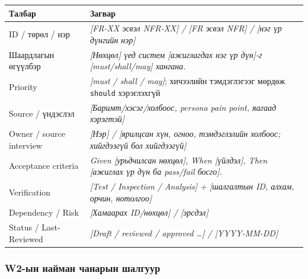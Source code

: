 \documentclass[
  11pt,
  a4paper,
]{article}
\begin{document}
\begin{longtable}[]{@{}
  >{\raggedright\arraybackslash}p{}
  >{\raggedright\arraybackslash}p{}@{}}
\toprule\noalign{}
\begin{minipage}[b]{\linewidth}\raggedright
Талбар
\end{minipage} & \begin{minipage}[b]{\linewidth}\raggedright
Загвар
\end{minipage} \\
\midrule\noalign{}
\endhead
\bottomrule\noalign{}
\endlastfoot
ID / төрөл / нэр & \emph{{[}FR-XX эсвэл NFR-XX{]} / {[}FR эсвэл NFR{]} /
{[}нэг үр дүнгийн нэр{]}} \\
Шаардлагын өгүүлбэр & \emph{{[}Нөхцөл{]} үед систем {[}ажиглагдах нэг үр
дүн{]}-г {[}must/shall/may{]} хангана.} \\
Priority & \emph{{[}must / shall / may{]}}; хичээлийн тэмдэглэгээг
мөрдөж \nolinkurl{should} хэрэглэхгүй \\
Source / үндэслэл & \emph{{[}Баримт/хэсэг/холбоос, persona pain point,
яагаад хэрэгтэй{]}} \\
Owner / source interview & \emph{{[}Нэр{]} / {[}ярилцсан хүн, огноо,
тэмдэглэлийн холбоос; хийгдээгүй бол хийгдээгүй{]}} \\
Acceptance criteria & \emph{Given {[}урьдчилсан нөхцөл{]}, When
{[}үйлдэл{]}, Then {[}ажиглах үр дүн ба pass/fail босго{]}.} \\
Verification & \emph{{[}Test / Inspection / Analysis{]} + {[}шалгалтын
ID, алхам, орчин, нотолгоо{]}} \\
Dependency / Risk & \emph{{[}Хамаарах ID/нөхцөл{]} / {[}эрсдэл{]}} \\
Status / Last-Reviewed & \emph{{[}Draft / reviewed / approved \ldots{]}
/ {[}YYYY-MM-DD{]}} \\
\end{longtable}

\subsubsection{W2-ын найман чанарын
шалгуур}\label{doc3-w2-ux44bux43d-ux43dux430ux439ux43cux430ux43d-ux447ux430ux43dux430ux440ux44bux43d-ux448ux430ux43bux433ux443ux443ux440}
\end{document}
